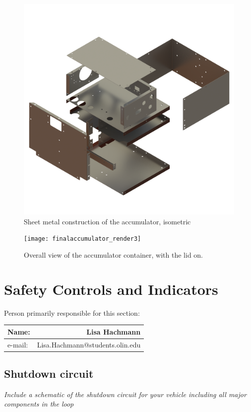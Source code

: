 \documentclass{article}
\begin{document}
\begin{figure}[H]
    \centering
    \includegraphics[width = 0.7 \textwidth]{sheetmetal_isoview}
    \caption{Sheet metal construction of the accumulator, isometric}
    \label{acc_sheet_iso}
\end{figure}

\begin{figure}[H]
    \centering
    \texttt{[image: finalaccumulator\_render3]}
    \caption{Overall view of the accumulator container, with the lid on.}
    \label{accumulator_iso}
\end{figure}

\section{Safety Controls and Indicators}

Person primarily responsible for this section:
    \begin{table}[H]
        \centering
        \label{responsible6}
        \begin{tabular}{lr}
        Name: & Lisa Hachmann \\ \hline
        e-mail: & Lisa.Hachmann@students.olin.edu \\ \hline
        \end{tabular}
    \end{table}

\subsection{Shutdown circuit}

\textit{Include a schematic of the shutdown circuit for your vehicle including all major components in the loop}
\end{document}
